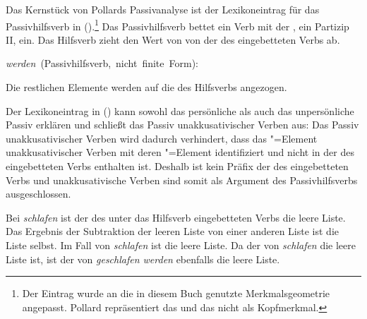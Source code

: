 {Das Kernstück von Pollards Passivanalyse ist der Lexikoneintrag für das Passivhilfsverb in ().\footnote{
        Der Eintrag wurde an die in diesem Buch genutzte Merkmalsgeometrie angepasst.
        Pollard repräsentiert das \ergm und das \subjm nicht als Kopfmerkmal.%
}
Das Passivhilfsverb bettet ein Verb mit der \vform{} , \dash ein Partizip II, ein.
Das Hilfsverb zieht den Wert von \HPSGerg {} von der \compsl des eingebetteten Verbs ab.

\eas
\label{le-passiv-prelim-Pollard}%
\mbox{\emph{werden} (Passivhilfsverb, nicht finite Form):} \\
\zs

\noindent
Die restlichen Elemente  werden auf die \compsl des Hilfsverbs angezogen.

Der Lexikoneintrag in () kann sowohl das persönliche als auch das unpersönliche
Passiv erklären und schließt das Passiv unakkusativischer Verben aus:
Das Passiv unakkusativischer Verben wird dadurch verhindert, dass das \HPSGerg"=Element
unakkusativischer Verben mit deren \subj"=Element identifiziert und nicht in der
\compsl des eingebetteten Verbs enthalten ist. Deshalb ist \HPSGerg kein Präfix
der \compsl des eingebetteten Verbs und unakkusativische Verben sind somit als
Argument des Passivhilfsverbs ausgeschlossen.

Bei \emph{schlafen} ist der \ergw des unter das Hilfsverb eingebetteten Verbs
die leere Liste. Das Ergebnis der Subtraktion der leeren Liste von einer anderen
Liste ist die Liste selbst. Im Fall von \emph{schlafen} ist  die leere Liste.
Da der \ergw von \emph{schlafen} die leere Liste ist, ist der \subjw 
von \emph{geschlafen werden} ebenfalls die leere Liste.

}
